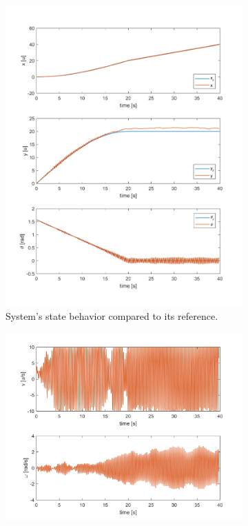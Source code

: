 \documentclass[conference]{IEEEtran}
\begin{document}
\begin{figure}
\centering
\begin{subfigure}[t]{0.4\textwidth}
\includegraphics[width=1.2\textwidth]{lmpc_states.png}
\caption{\label{fig:lmpcxl}System's state behavior compared to its reference.}
\end{subfigure}
\begin{subfigure}[t]{0.4\textwidth}
\includegraphics[width=1.2\textwidth]{lmpc_control.png}

\end{subfigure}
\end{figure}
\end{document}
